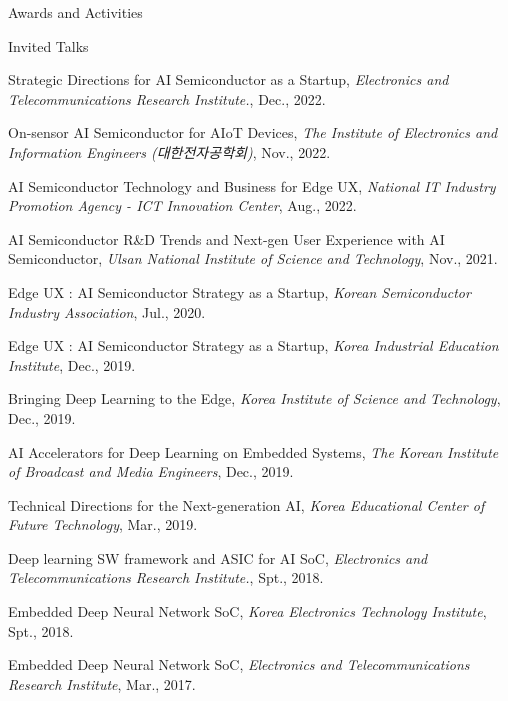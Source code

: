 \documentclass{resume} %
\newcommand{\ko}[1]{{\upshape\koreanfont #1}}
\begin{document}
\begin{section}{Awards and Activities}
\begin{subsection}{Invited Talks}{}{}{}
\item Strategic Directions for AI Semiconductor as a Startup,
{\small\textit{Electronics and Telecommunications Research Institute.}, Dec., 2022.}

\item On-sensor AI Semiconductor for AIoT Devices,
{\small\textit{The Institute of Electronics and Information Engineers (\ko{대한전자공학회})}, Nov., 2022.}

\item AI Semiconductor Technology and Business for Edge UX,
{\small\textit{National IT Industry Promotion Agency - ICT Innovation Center}, Aug., 2022.}

\item AI Semiconductor R\&D Trends and Next-gen User Experience with AI Semiconductor,
{\small\textit{Ulsan National Institute of Science and Technology}, Nov., 2021.}

\item Edge UX : AI Semiconductor Strategy as a Startup,
{\small\textit{Korean Semiconductor Industry Association}, Jul., 2020.}

\item Edge UX : AI Semiconductor Strategy as a Startup,
{\small\textit{Korea Industrial Education Institute}, Dec., 2019.}

\item Bringing Deep Learning to the Edge,
{\small\textit{Korea Institute of Science and Technology}, Dec., 2019.}

\item AI Accelerators for Deep Learning on Embedded Systems,
{\small\textit{The Korean Institute of Broadcast and Media Engineers}, Dec., 2019.}

\item Technical Directions for the Next-generation AI,
{\small\textit{Korea Educational Center of Future Technology}, Mar., 2019.}

\item Deep learning SW framework and ASIC for AI SoC,
{\small\textit{Electronics and Telecommunications Research Institute.}, Spt., 2018.}

\item Embedded Deep Neural Network SoC,
{\small\textit{Korea Electronics Technology Institute}, Spt., 2018.}

\item Embedded Deep Neural Network SoC,
{\small\textit{Electronics and Telecommunications Research Institute}, Mar., 2017.}


\end{subsection}
\end{section}
\end{document}
